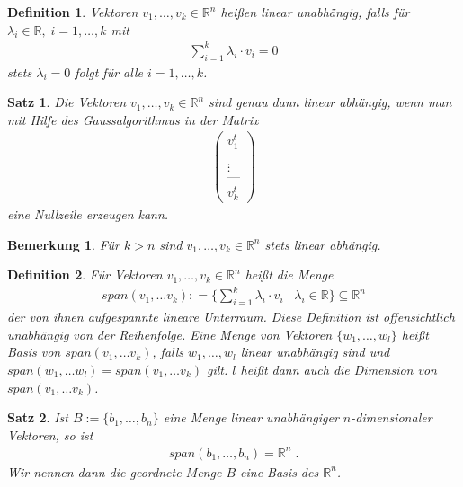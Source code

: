 \documentclass[]{article}
\newtheorem{Definition}{Definition}
\newtheorem{Satz}{Satz}
\newtheorem{Bemerkung}{Bemerkung}
\begin{document}
\begin{Definition}
Vektoren $v_1, \hdots ,v_k \in \mathbb{R}^n$ heißen linear unabhängig, falls für $\lambda_i \in \mathbb{R}, \; i=1, \hdots ,k $ mit
\begin{align*}
\sum_{i= 1}^k \lambda_i \cdot v_i = 0
\end{align*} 
stets $\lambda_i = 0$ folgt für alle $i = 1, \hdots, k$. 
\end{Definition}

\begin{Satz}
Die Vektoren $v_1, \hdots ,v_k \in \mathbb{R}^n$ sind genau dann linear abhängig, wenn man 
mit Hilfe des Gaussalgorithmus in der Matrix 
\begin{align*}
\begin{pmatrix}
v_1^t \\   \text{---} \\ \vdots \\  \text{---} \\ v_k^t
\end{pmatrix}
\end{align*}
eine Nullzeile erzeugen kann.
\end{Satz}

\begin{Bemerkung}
Für $k>n$ sind $v_1, \hdots ,v_k \in \mathbb{R}^n$ stets linear abhängig.
\end{Bemerkung}

\begin{Definition}
Für Vektoren $v_1, \hdots , v_k \in \mathbb{R}^n$ heißt die Menge
\begin{align*}
span(v_1, \hdots v_k) : = \biggl\{ \sum_{i=1}^k \lambda_i \cdot v_i \; | \; \lambda_i \in \mathbb{R}  \biggr\} \subseteq \mathbb{R}^n
\end{align*}
der von ihnen aufgespannte lineare Unterraum. Diese Definition ist offensichtlich unabhängig von der Reihenfolge. 
Eine Menge von Vektoren $\{ w_1, \hdots , w_l \}$ heißt Basis von
$span(v_1, \hdots v_k)$, falls $w_1, \hdots , w_l$ linear unabhängig sind und
$span(w_1, \hdots w_l) = span(v_1, \hdots v_k)$ gilt. $l$ heißt dann auch die Dimension von $span(v_1, \hdots v_k)$. 
\end{Definition}


\begin{Satz}
Ist $B:= \{ b_1, \hdots , b_n \}$ eine Menge linear unabhängiger $n$-dimensionaler Vektoren, so ist
\begin{align*}
span(b_1, \hdots ,b_n) = \mathbb{R}^n \; .
\end{align*}
Wir nennen dann die \emph{geordnete} Menge $B$ eine Basis des $\mathbb{R}^n$. 
\end{Satz}
\end{document}
